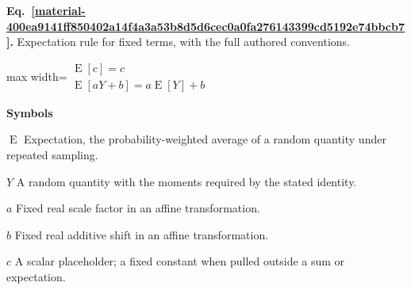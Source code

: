 \documentclass[11pt,a4paper]{article}
\begin{document}
\par\medskip
\noindent\begin{minipage}{\linewidth}
\label{material-400ea9141ff850402a14f4a3a53b8d5d6cec0a0fa276143399cd5192e74bbcb7}
\noindent\textbf{Eq.~\ref*{material-400ea9141ff850402a14f4a3a53b8d5d6cec0a0fa276143399cd5192e74bbcb7}.} Expectation rule for fixed terms, with the full authored conventions.\par\nopagebreak
\begin{center}\begin{adjustbox}{max width=\linewidth}$\displaystyle \begin{gathered}\operatorname{E}[c]=c\\\operatorname{E}[aY+b]=a\operatorname{E}[Y]+b\end{gathered}$\end{adjustbox}\end{center}

\par\noindent\textbf{Symbols}

\par\noindent\textbf{\(\operatorname{E}\)} Expectation, the probability-weighted average of a random quantity under repeated sampling.

\par\noindent\textbf{\(Y\)} A random quantity with the moments required by the stated identity.

\par\noindent\textbf{\(a\)} Fixed real scale factor in an affine transformation.

\par\noindent\textbf{\(b\)} Fixed real additive shift in an affine transformation.

\par\noindent\textbf{\(c\)} A scalar placeholder; a fixed constant when pulled outside a sum or expectation.

\end{minipage}\par
\medskip
\end{document}
